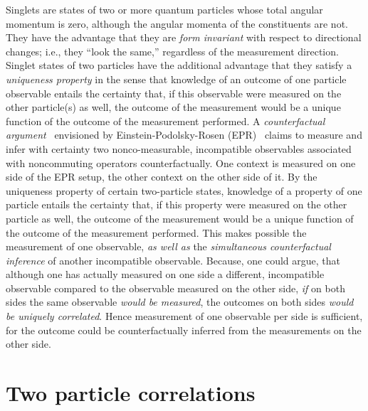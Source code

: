 \documentclass[pra,amsfonts,showpacs,showkeys,preprint]{revtex4}
\begin{document}
Singlets are states of two or more quantum particles whose total angular momentum is zero,
although the angular momenta of the constituents are not.
They have the advantage that
they are {\em form invariant} with respect to directional changes; i.e., they ``look the same,'' regardless of the measurement direction.
Singlet states of two particles have the additional advantage that they satisfy a {\em uniqueness property} \cite{svozil-2006-uniquenessprinciple}
in the sense that knowledge of an outcome of one particle observable entails the certainty that,
if this observable were measured on the other particle(s) as well,
the outcome of the measurement would be a unique function of the outcome of the measurement performed.
A {\em counterfactual argument}~\cite[p.~243]{specker-60} envisioned by
Einstein-Podolsky-Rosen (EPR)~\cite{epr}
claims to measure and infer with certainty two nonco-measurable, incompatible observables associated with noncommuting operators counterfactually.
One context is measured on one side of the EPR setup, the other context on the other side of it.
By the uniqueness property  of certain two-particle states,
knowledge of a property of one particle entails the certainty
that, if this property were measured on the other particle as well, the outcome of the measurement would be
a unique function of the outcome of the measurement performed.
This makes possible the measurement of one observable, {\em as well as} the {\em simultaneous counterfactual inference} of another incompatible observable.
Because, one could argue, that although one has actually measured on one side a different, incompatible observable compared to the observable measured on the other side,
{\em if} on both sides the same  observable {\em would be measured}, the outcomes on both sides {\em would be uniquely correlated}.
Hence measurement of one observable per side is sufficient, for the outcome could be counterfactually inferred from the measurements on the other side.



\section{Two particle correlations}
\end{document}

